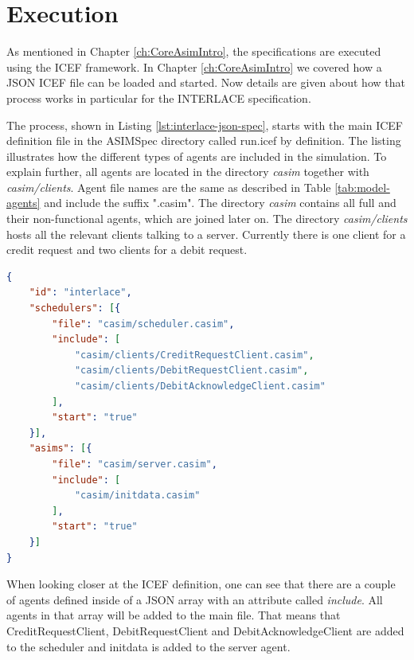 \section{Execution}

As mentioned in Chapter \ref{ch:CoreAsimIntro}, the specifications are executed using the ICEF framework. In Chapter \ref{ch:CoreAsimIntro} we covered how a JSON ICEF file can be loaded and started. Now details are given about how that process works in particular for the INTERLACE specification.

The process, shown in Listing \ref{lst:interlace-json-spec}, starts with the main ICEF definition file in the ASIMSpec directory called run.icef by definition. The listing illustrates how the different types of agents are included in the simulation. To explain further, all agents are located in the directory \textit{casim} together with \textit{casim/clients}. Agent file names are the same as described in Table \ref{tab:model-agents} and include the suffix ".casim". The directory \textit{casim} contains all full and their non-functional agents, which are joined later on. The directory \textit{casim/clients} hosts all the relevant clients talking to a server. Currently there is one client for a credit request and two clients for a debit request.

\begin{center}
\begin{minipage}{0.8\textwidth}
\small
\begin{lstlisting}[language=json,firstnumber=1,caption={\bf\small ICEF JSON Specification for INTERLACE},captionpos=b,label=lst:interlace-json-spec]
{
    "id": "interlace", 
    "schedulers": [{
        "file": "casim/scheduler.casim",
        "include": [
            "casim/clients/CreditRequestClient.casim",
            "casim/clients/DebitRequestClient.casim",
            "casim/clients/DebitAcknowledgeClient.casim"
        ],
        "start": "true"
    }],
    "asims": [{
        "file": "casim/server.casim",
        "include": [
            "casim/initdata.casim"
        ],
        "start": "true"
    }]
}
\end{lstlisting}
\end{minipage}
\end{center}

When looking closer at the ICEF definition, one can see that there are a couple of agents defined inside of a JSON array with an attribute called \textit{include}. All agents in that array will be added to the main file. That means that CreditRequestClient, DebitRequestClient and DebitAcknowledgeClient are added to the scheduler and initdata is added to the server agent.


